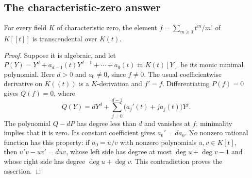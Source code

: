 \subsection{The characteristic-zero answer}\label{subsec:A1}

\begin{lemma}\label{SA23-A-03}
For every field $K$ of characteristic zero, the element
$f=\sum_{m\geq0}t^m/m!$ of $K[[t]]$ is transcendental over $K(t)$.
\end{lemma}
\begin{proof}
Suppose it is algebraic, and let
$P(Y)=Y^d+a_{d-1}(t)Y^{d-1}+\cdots+a_0(t)$ in $K(t)[Y]$
be its monic minimal polynomial.  Here $d>0$ and $a_0\ne0$, since
$f\ne0$.  The usual coefficientwise derivative on $K((t))$ is a
$K$-derivation and $f'=f$.  Differentiating $P(f)=0$ gives
$Q(f)=0$, where
\[
 Q(Y)=dY^d+\sum_{j=0}^{d-1}\bigl(a_j'(t)+j a_j(t)\bigr)Y^j.
\]
The polynomial $Q-dP$ has degree less than $d$ and vanishes at $f$;
minimality implies that it is zero.  Its constant coefficient gives
$a_0'=d a_0$.  No nonzero rational function has this property: if
$a_0=u/v$ with nonzero polynomials $u,v\in K[t]$, then
$u'v-uv'=d uv$, whose left side has degree at most
$\deg u+\deg v-1$ and whose right side has degree
$\deg u+\deg v$.  This contradiction proves the assertion.
\end{proof}

